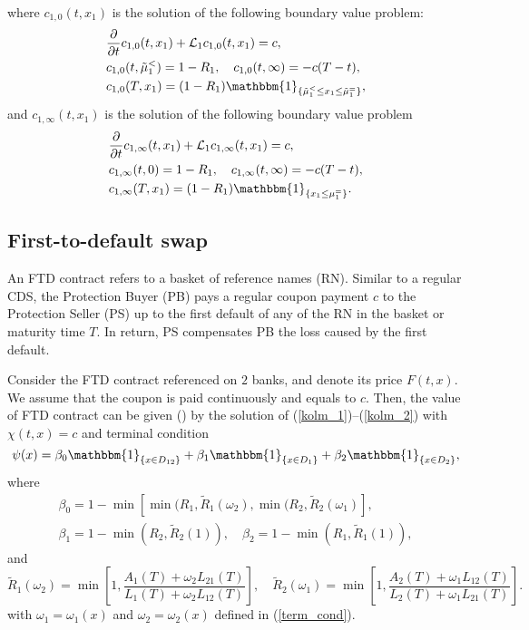 where $c_{1,0}(t, x_1)$ is the solution of the following boundary value problem:
\begin{equation}
\begin{aligned}
		& \frac{\partial}{\partial t} c_{1, 0}(t, x_1) + \mathcal{L}_1 c_{1, 0}(t, x_1) = c, \\
		& c_{1, 0}(t, \tilde{\mu}_1^{<}) = 1 - R_1, \quad c_{1, 0}(t, \infty) = -c(T-t), \\
		& c_{1, 0}(T, x_1) = (1 - R_1) \mathbbm{1}_{\{\tilde{\mu}_1^{<} \le x_1 \le \tilde{\mu}_1^{=}\}}, 
\end{aligned}
\end{equation}
and $c_{1,\infty}(t, x_1)$ is the solution of the following boundary value problem
\begin{equation}
\begin{aligned}
		& \frac{\partial}{\partial t} c_{1, \infty}(t, x_1) + \mathcal{L}_1 c_{1, \infty}(t, x_1) = c, \\
		& c_{1, \infty}(t, 0) = 1 - R_1, \quad c_{1, \infty}(t, \infty) = -c(T-t), \\
		& c_{1, \infty}(T, x_1) = (1 - R_1) \mathbbm{1}_{\{x_1 \le \mu_1^{=}\}}.
\end{aligned}
\end{equation}

\subsection{First-to-default swap}
An FTD contract refers to a basket of reference names (RN). Similar to a regular CDS, the Protection Buyer (PB) pays a regular coupon payment $c$ to the Protection Seller (PS) up to the first default of any of the RN in the basket or maturity time $T$. In return, PS compensates PB the loss caused by the first default.

Consider the FTD contract referenced on $2$ banks, and denote its price $F(t, x)$. We assume that the coupon is paid continuously and equals to $c$. Then, the value of FTD contract can be given (\cite{LiptonItkin2015}) by the solution of  (\ref{kolm_1})--(\ref{kolm_2})  with $\chi(t, x) = c$ and terminal condition
\begin{equation*}
	\psi(x) = \beta_0  \mathbbm{1}_{\{x \in D_{12}\}} + \beta_1 \mathbbm{1}_{\{x \in D_{1}\}} + \beta_2 \mathbbm{1}_{\{x \in D_{2}\}},
\end{equation*}
where
\begin{equation*}
	\begin{aligned}
		\beta_0 = 1 - \min[\min(R_1, \tilde{R}_1(\omega_2), \min(R_2, \tilde{R}_2(\omega_1)], \\
		\beta_1 = 1 - \min(R_2, \tilde{R}_2(1)), \quad \beta_2 = 1 - \min(R_1, \tilde{R}_1(1)),
	\end{aligned}
\end{equation*}
and
\begin{equation*}
	\tilde{R}_1(\omega_2) = \min \left[1, \frac{A_1(T) +  \omega_2 L_{2 1}(T)}{L_1(T) + \omega_2 L_{12}(T)}\right], \quad \tilde{R}_2(\omega_1) = \min \left[1, \frac{A_2(T) +  \omega_1 L_{1 2}(T)}{L_2(T) + \omega_1 L_{21}(T)}\right].
\end{equation*}
with $\omega_1 = \omega_1(x)$ and $\omega_2 = \omega_2(x)$ defined in (\ref{term_cond}).

